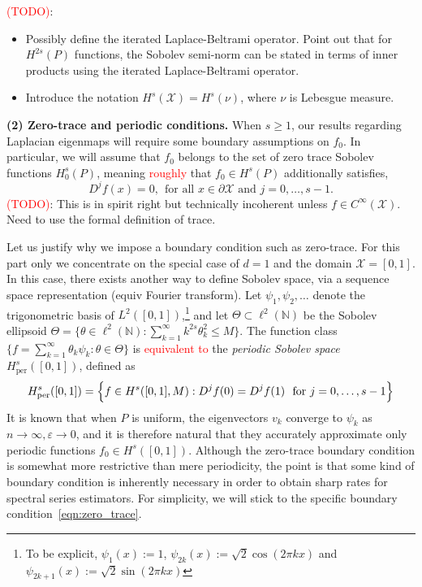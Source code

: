 \documentclass{article}
\newcommand{\1}{\mathbf{1}}
\newcommand{\Leb}{L}
\newcommand{\mc}[1]{\mathcal{#1}}
\theoremstyle{alden}
\theoremstyle{aldenthm}
\theoremstyle{definition}
\theoremstyle{remark}
\begin{document}
\textcolor{red}{(TODO)}: 
\begin{itemize}
	\item Possibly define the iterated Laplace-Beltrami operator. Point out that for $H^{2s}(P)$ functions, the Sobolev semi-norm can be stated in terms of inner products using the iterated Laplace-Beltrami operator.
	\item Introduce the notation $H^s(\mc{X}) = H^s(\nu)$, where $\nu$ is Lebesgue measure.
\end{itemize}

\textbf{(2) Zero-trace and periodic conditions.}
When $s \geq 1$, our results regarding Laplacian eigenmaps will require some boundary assumptions on $f_0$. In particular, we will assume that $f_0$ belongs to the set of zero trace Sobolev functions $H_0^{s}(P)$, meaning \textcolor{red}{roughly} that $f_0 \in H^s(P)$ additionally satisfies,
\begin{equation}
\label{eqn:zero_trace}
D^jf(x) = 0,~~\textrm{for all $x \in \partial \mc{X}$ and $j = 0,\ldots,s - 1$.}
\end{equation}
\textcolor{red}{(TODO)}: This is in spirit right but technically incoherent unless $f \in C^{\infty}(\mc{X})$. Need to use the formal definition of trace.

Let us justify why we impose a boundary condition such as zero-trace. For this part only we concentrate on the special case of $d = 1$ and the domain $\mc{X} = [0,1]$. In this case, there exists another way to define Sobolev space, via a sequence space representation (equiv Fourier transform). Let $\psi_1,\psi_2,\ldots$ denote the trigonometric basis of $\Leb^2([0,1])$,\footnote{To be explicit, $\psi_1(x) := 1$, $\psi_{2k}(x) := \sqrt{2} \cos(2\pi k x)$ and $\psi_{2k + 1}(x) := \sqrt{2} \sin(2\pi k x)$} and let $\Theta \subset \ell^2(\mathbb{N})$ be the Sobolev ellipsoid $\Theta = \{\theta \in \ell^2(\mathbb{N}): \sum_{k = 1}^{\infty} k^{2s} \theta_k^2 \leq M\}$. The function class $\{f = \sum_{k = 1}^{\infty} \theta_k \psi_k: \theta \in \Theta\}$ is \textcolor{red}{equivalent to} the \emph{periodic Sobolev space} $H_{\mathrm{per}}^s([0,1])$, defined as
\begin{equation}
\label{eqn:periodic_sobolev_space}
H_{\mathrm{per}}^s([0,1]) = \Bigl\{f \in H^s([0,1],M): D^jf(0) = D^jf(1)~~\textrm{for $j = 0,\ldots, s - 1$} \Bigr\}
\end{equation}
It is known that when $P$ is uniform, the eigenvectors $v_k$ converge to $\psi_k$ as $n \to \infty, \varepsilon \to 0$, and it is therefore natural that they accurately approximate only periodic functions $f_0 \in H^s([0,1])$. Although the zero-trace boundary condition is somewhat more restrictive than mere periodicity, the point is that some kind of boundary condition is inherently necessary in order to obtain sharp rates for spectral series estimators. For simplicity, we will stick to the specific boundary condition~\eqref{eqn:zero_trace}. 
\end{document}
